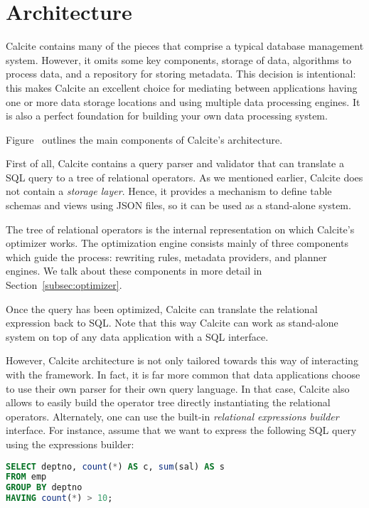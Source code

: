 \section{Architecture}
\label{sec:archi}

Calcite contains many of the pieces that comprise a typical database management system. However, it omits some key components, \eg storage of data, algorithms to process data, and a repository for storing metadata. This decision is intentional: this makes Calcite an excellent choice for mediating between applications having one or more data storage locations and using multiple data processing engines. It is also a perfect foundation for building your own data processing system.

Figure~ outlines the main components of Calcite's architecture.

First of all, Calcite contains a query parser and validator that can translate a SQL query to a tree of relational operators. As we mentioned earlier, Calcite does not contain a \textit{storage layer}. Hence, it provides a mechanism to define table schemas and views using JSON files, so it can be used as a stand-alone system.

The tree of relational operators is the internal representation on which Calcite's optimizer works. The optimization engine consists mainly of three components which guide the process: rewriting rules, metadata providers, and planner engines. We talk about these components in more detail in Section~\ref{subsec:optimizer}.

Once the query has been optimized, Calcite can translate the relational expression back to SQL. Note that this way Calcite can work as stand-alone system on top of any data application with a SQL interface.

However, Calcite architecture is not only tailored towards this way of interacting with the framework. In fact, it is far more common that data applications choose to use their own parser for their own query language. In that case, Calcite also allows to easily build the operator tree directly instantiating the relational operators. Alternately, one can use the built-in \textit{relational expressions builder} interface. For instance, assume that we want to express the following SQL query using the expressions builder:

\begin{lstlisting}[language=SQL]
SELECT deptno, count(*) AS c, sum(sal) AS s
FROM emp
GROUP BY deptno
HAVING count(*) > 10;
\end{lstlisting}

